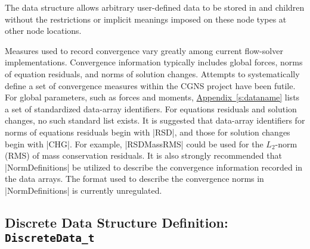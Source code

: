 The  data structure allows arbitrary
user-defined data to be stored in  and
 children without the restrictions or implicit
meanings imposed on these node types at other node locations.

Measures used to record convergence vary greatly among current
flow-solver implementations.
Convergence information typically includes global forces, norms of
equation residuals, and norms of solution changes.
Attempts to systematically define a set of convergence measures within
the CGNS project have been futile.
For global parameters, such as forces and moments,
\hyperref[s:dataname]{Appendix~\ref*{s:dataname}} lists a set of
standardized data-array identifiers.
For equations residuals and solution changes, no such standard list
exists.
It is suggested that data-array identifiers for norms of equations
residuals begin with |RSD|, and those for solution changes begin with
|CHG|.
For example, |RSDMassRMS| could be used for the $L_2$-norm (RMS) of mass
conservation residuals.
It is also strongly recommended that |NormDefinitions| be utilized to
describe the convergence information recorded in the data arrays.
The format used to describe the convergence norms in |NormDefinitions|
is currently unregulated.

\subsection{Discrete Data Structure Definition: \texttt{DiscreteData\_t}} 
\label{s:DiscreteData}

